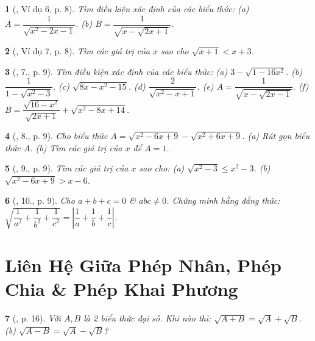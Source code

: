 \documentclass{article}
\newtheorem{baitoan}{}
\begin{document}
\begin{baitoan}[\cite{Binh_Toan_9_tap_1}, Ví dụ 6, p. 8]
	Tìm điều kiện xác định của các biểu thức: (a) $A = \dfrac{1}{\sqrt{x^2 - 2x - 1}}$. (b) $B = \dfrac{1}{\sqrt{x - \sqrt{2x + 1}}}$.
\end{baitoan}

\begin{baitoan}[\cite{Binh_Toan_9_tap_1}, Ví dụ 7, p. 8]
	Tìm các giá trị của $x$ sao cho $\sqrt{x + 1} < x + 3$.
\end{baitoan}

\begin{baitoan}[\cite{Binh_Toan_9_tap_1}, 7., p. 9]
	Tìm điều kiện xác định của các biểu thức: (a) $3 - \sqrt{1 - 16x^2}$. (b) $\dfrac{1}{1 - \sqrt{x^2 - 3}}$. (c) $\sqrt{8x - x^2 - 15}$. (d) $\dfrac{2}{\sqrt{x^2 - x + 1}}$. (e) $A = \dfrac{1}{\sqrt{x - \sqrt{2x - 1}}}$. (f) $B = \dfrac{\sqrt{16 - x^2}}{\sqrt{2x + 1}} + \sqrt{x^2 - 8x + 14}$.
\end{baitoan}

\begin{baitoan}[\cite{Binh_Toan_9_tap_1}, 8., p. 9]
	Cho biểu thức $A = \sqrt{x^2 - 6x + 9} - \sqrt{x^2 + 6x + 9}$. (a) Rút gọn biểu thức $A$. (b) Tìm các giá trị của $x$ để $A = 1$.
\end{baitoan}

\begin{baitoan}[\cite{Binh_Toan_9_tap_1}, 9., p. 9]
	Tìm các giá trị của $x$ sao cho: (a) $\sqrt{x^2 - 3}\le x^2 - 3$. (b) $\sqrt{x^2 - 6x + 9} > x - 6$.
\end{baitoan}

\begin{baitoan}[\cite{Binh_Toan_9_tap_1}, 10., p. 9]
	Cho $a + b + c = 0$ \& $abc\ne0$. Chứng minh hằng đẳng thức: $\sqrt{\dfrac{1}{a^2} + \dfrac{1}{b^2} + \dfrac{1}{c^2}} = \left|\dfrac{1}{a} + \dfrac{1}{b} + \dfrac{1}{c}\right|$.
\end{baitoan}


\section{Liên Hệ Giữa Phép Nhân, Phép Chia \& Phép Khai Phương}

\begin{baitoan}[\cite{Binh_boi_duong_Toan_9_tap_1}, p. 16]
	Với $A,B$ là 2 biểu thức đại số. Khi nào thì: $\sqrt{A + B} = \sqrt{A} + \sqrt{B}$. (b) $\sqrt{A - B} = \sqrt{A} - \sqrt{B}$?
\end{baitoan}
\end{document}
